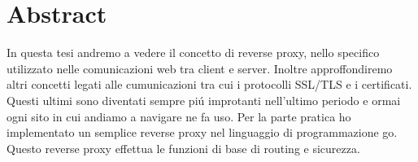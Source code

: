 \chapter*{Abstract}
\label{cha:abtract}
In questa tesi andremo a vedere il concetto di reverse proxy, nello specifico utilizzato nelle comunicazioni web tra client e server. Inoltre approffondiremo altri concetti legati alle cumunicazioni tra cui i protocolli SSL/TLS e i certificati. Questi ultimi sono diventati sempre piú improtanti nell'ultimo periodo e ormai ogni sito in cui andiamo a navigare ne fa uso. Per la parte pratica ho implementato un semplice reverse proxy nel linguaggio di programmazione go. Questo reverse proxy effettua le funzioni di base di routing e sicurezza.
